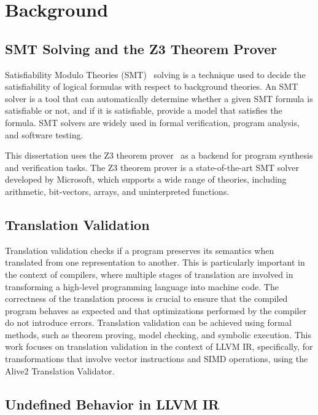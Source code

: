 \chapter{Background}
\label{chap:background}

\section {SMT Solving and the Z3 Theorem Prover}

Satisfiability Modulo Theories (SMT)~\cite{barrett2018satisfiability}
solving is a technique used to decide the satisfiability of logical
formulas with respect to background theories.
%
An SMT solver is a tool that can automatically determine whether a
given SMT formula is satisfiable or not, and if it is satisfiable,
provide a model that satisfies the formula.
%
SMT solvers are widely used in formal verification, program analysis,
and software testing.

This dissertation uses the Z3 theorem prover~\cite{z3} as a backend
for program synthesis and verification tasks.
%
The Z3 theorem prover is a state-of-the-art SMT solver developed by
Microsoft, which supports a wide range of theories, including
arithmetic, bit-vectors, arrays, and uninterpreted functions.

\section {Translation Validation}

Translation validation checks if a program preserves its semantics
when translated from one representation to another.
%
This is particularly important in the context of compilers,
where multiple stages of translation are involved in transforming a
high-level programming language into machine code.
%
The correctness of the translation process is crucial to ensure that
the compiled program behaves as expected and that optimizations
performed by the compiler do not introduce errors.
%
Translation validation can be achieved using formal methods, such as
theorem proving, model checking, and symbolic execution.
%
This work focuses on translation validation in the context of
LLVM IR, specifically, for transformations that involve vector
instructions and SIMD operations, using the Alive2 Translation Validator.

\section {Undefined Behavior in LLVM IR}


